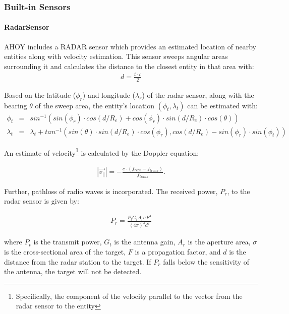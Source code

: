 \documentclass[titlepage]{article}
\begin{document}
\subsubsection{Built-in Sensors}
\paragraph{RadarSensor}{AHOY includes a RADAR sensor which provides an estimated location of nearby entities along with velocity estimation.  This sensor sweeps angular areas surrounding it and calculates the distance to the closest entity in that area with:
\label{sec:radar}
\begin{align*}
    d = \frac{t \cdot c}{2}
\end{align*}

Based on the latitude ($\phi_r$) and longitude ($\lambda_r$) of the radar sensor, along with the bearing $\theta$ of the sweep area, the entity's location $\left(\phi_t, \lambda_t\right)$ can be estimated with:
\begin{align*}
    \phi_t &=& sin^{-1}\left(sin\left(\phi_r\right) \cdot cos\left(d/R_{e}\right) + cos\left(\phi_r\right) \cdot sin\left(d/R_{e}\right) \cdot cos\left(\theta\right)\right) \\ 
    \lambda_t &=& \lambda_t + tan^{-1}\left(sin\left(\theta\right) \cdot sin\left(d/R_{e}\right) \cdot cos\left(\phi_r\right), cos\left(d/R_{e}\right)-sin\left(\phi_r\right) \cdot sin\left(\phi_t\right)\right)
\end{align*}

An estimate of velocity\footnote{Specifically, the component of the velocity parallel to the vector from the radar sensor to the entity} is calculated by the Doppler equation:

\begin{align*}
    \left|\vec{v_{\parallel}}\right| = -\frac{c \cdot \left(f_{recv} - f_{trans}\right)}{f_{trans}}.
\end{align*}

Further, pathloss of radio waves is incorporated. The received power, $P_r$, to the radar sensor is given by:

\begin{align*}
    P_r = \frac{P_t G_t A_r \sigma F^4}{\left(4 \pi\right)^4 d^4}
\end{align*}

where $P_t$ is the transmit power, $G_t$ is the antenna gain, $A_r$ is the aperture area, $\sigma$ is the cross-sectional area of the target, $F$ is a propagation factor, and $d$ is the distance from the radar station to the target.  If $P_r$ falls below the sensitivity of the antenna, the target will not be detected.
}
\end{document}

